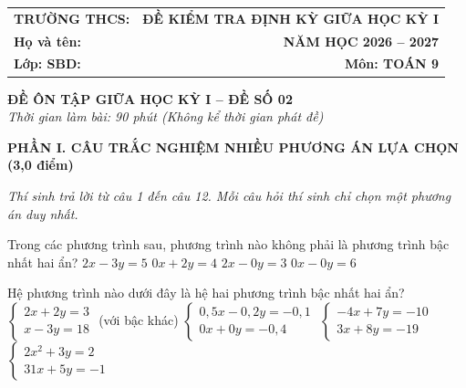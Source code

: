 \documentclass[12pt,a4paper]{article}
\begin{document}
\noindent
\begin{tabularx}{\linewidth}{X r}
\textbf{TRƯỜNG THCS: \dotfill} & \textbf{ĐỀ KIỂM TRA ĐỊNH KỲ GIỮA HỌC KỲ I} \\
\textbf{Họ và tên: \dotfill} & \textbf{NĂM HỌC 2026 -- 2027} \\
\textbf{Lớp: \dotfill \quad SBD: \dotfill} & \textbf{Môn: TOÁN 9} \\
\hline
\end{tabularx}
\vspace{2mm}

\begin{center}
  \textbf{\large ĐỀ ÔN TẬP GIỮA HỌC KỲ I -- ĐỀ SỐ 02}\\
  \textit{Thời gian làm bài: 90 phút (Không kể thời gian phát đề)}
\end{center}
\vspace{1mm}

\noindent\textbf{\large PHẦN I. CÂU TRẮC NGHIỆM NHIỀU PHƯƠNG ÁN LỰA CHỌN (3,0 điểm)}

\textit{Thí sinh trả lời từ câu 1 đến câu 12. Mỗi câu hỏi thí sinh chỉ chọn một phương án duy nhất.}

\vspace{1mm}
\begin{ex}
Trong các phương trình sau, phương trình nào không phải là phương trình bậc nhất hai ẩn?
\choice
{$2x - 3y = 5$}
{$0x + 2y = 4$}
{$2x - 0y = 3$}
{\True $0x - 0y = 6$}
\end{ex}

\begin{ex}
Hệ phương trình nào dưới đây là hệ hai phương trình bậc nhất hai ẩn?
\choice
{$\begin{cases} 2x + 2y = 3 \\ x - 3y = 18 \end{cases}$ (với bậc khác)}
{$\begin{cases} 0{,}5x - 0{,}2y = -0{,}1 \\ 0x + 0y = -0{,}4 \end{cases}$}
{\True $\begin{cases} -4x + 7y = -10 \\ 3x + 8y = -19 \end{cases}$}
{$\begin{cases} 2x^2 + 3y = 2 \\ 31x + 5y = -1 \end{cases}$}
\end{ex}
\end{document}
